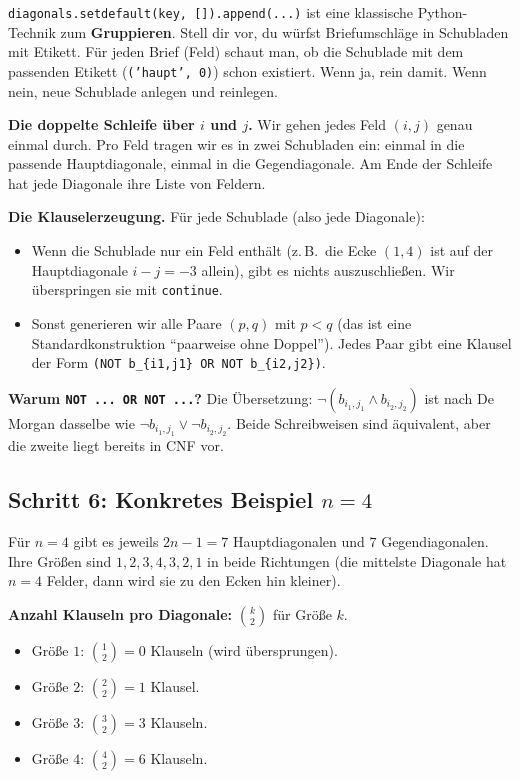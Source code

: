 \documentclass[a4paper,12pt]{article}
\begin{document}
\begin{analogie}
\texttt{diagonals.setdefault(key, []).append(...)} ist eine klassische
Python-Technik zum \textbf{Gruppieren}. Stell dir vor, du w\"urfst
Briefumschl\"age in Schubladen mit Etikett. F\"ur jeden Brief (Feld)
schaut man, ob die Schublade mit dem passenden Etikett
(\texttt{('haupt', 0)}) schon existiert. Wenn ja, rein damit. Wenn
nein, neue Schublade anlegen und reinlegen.
\end{analogie}

\textbf{Die doppelte Schleife \"uber $i$ und $j$.} Wir gehen jedes
Feld $(i,j)$ genau einmal durch. Pro Feld tragen wir es in zwei
Schubladen ein: einmal in die passende Hauptdiagonale, einmal in die
Gegendiagonale. Am Ende der Schleife hat jede Diagonale ihre Liste
von Feldern.

\textbf{Die Klauselerzeugung.} F\"ur jede Schublade (also jede
Diagonale):
\begin{itemize}[nosep]
\item Wenn die Schublade nur ein Feld enth\"alt (z.\,B.\ die Ecke
      $(1,4)$ ist auf der Hauptdiagonale $i-j = -3$ allein), gibt es
      nichts auszuschlie{\ss}en. Wir \"uberspringen sie mit
      \texttt{continue}.
\item Sonst generieren wir alle Paare $(p, q)$ mit $p < q$ (das ist
      eine Standardkonstruktion "`paarweise ohne Doppel"'). Jedes Paar
      gibt eine Klausel der Form
      \texttt{(NOT b\_\{i1,j1\} OR NOT b\_\{i2,j2\})}.
\end{itemize}

\textbf{Warum \texttt{NOT ... OR NOT ...}?} Die \"Ubersetzung: $\neg
(b_{i_1,j_1} \wedge b_{i_2,j_2})$ ist nach De Morgan dasselbe wie
$\neg b_{i_1,j_1} \vee \neg b_{i_2,j_2}$. Beide Schreibweisen sind
\"aquivalent, aber die zweite liegt bereits in CNF vor.

\subsection*{Schritt 6: Konkretes Beispiel $n = 4$}

F\"ur $n = 4$ gibt es jeweils $2n - 1 = 7$ Hauptdiagonalen und $7$
Gegendiagonalen. Ihre Gr\"o{\ss}en sind $1, 2, 3, 4, 3, 2, 1$ in beide
Richtungen (die mittelste Diagonale hat $n = 4$ Felder, dann wird sie
zu den Ecken hin kleiner).

\textbf{Anzahl Klauseln pro Diagonale:} $\binom{k}{2}$ f\"ur
Gr\"o{\ss}e $k$.
\begin{itemize}[nosep]
\item Gr\"o{\ss}e $1$: $\binom{1}{2} = 0$ Klauseln (wird \"ubersprungen).
\item Gr\"o{\ss}e $2$: $\binom{2}{2} = 1$ Klausel.
\item Gr\"o{\ss}e $3$: $\binom{3}{2} = 3$ Klauseln.
\item Gr\"o{\ss}e $4$: $\binom{4}{2} = 6$ Klauseln.
\end{itemize}
\end{document}
